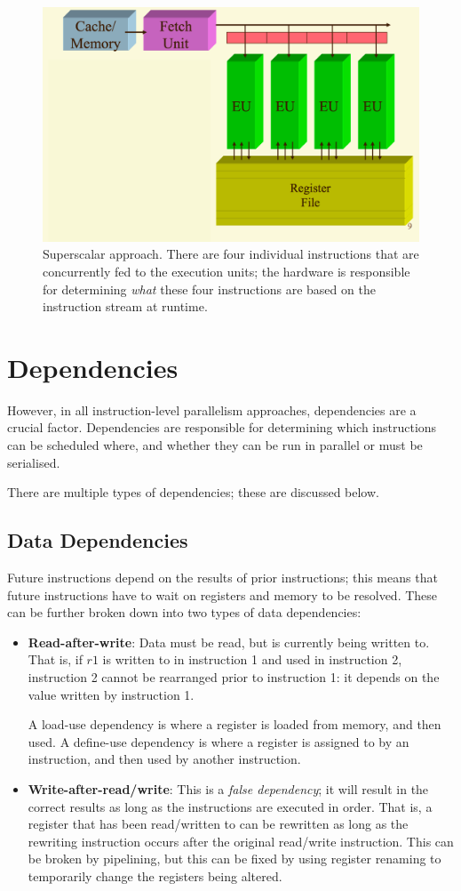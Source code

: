 \begin{figure}
\centering
\includegraphics[width=0.7\linewidth]{figures/screenshot068}
\caption[Superscalar approach.]{Superscalar approach. There are four individual instructions that are concurrently fed to the execution units; the hardware is responsible for determining \textit{what} these four instructions are based on the instruction stream at runtime.}
\label{fig:screenshot068}
\end{figure}

\section{Dependencies}
\label{sec:dependencies}
However, in all instruction-level parallelism approaches, dependencies are a crucial factor. Dependencies are responsible for determining which instructions can be scheduled where, and whether they can be run in parallel or must be serialised.

There are multiple types of dependencies; these are discussed below.

\subsection{Data Dependencies}
Future instructions depend on the results of prior instructions; this means that future instructions have to wait on registers and memory to be resolved. These can be further broken down into two types of data dependencies: \begin{itemize}
\item \textbf{Read-after-write}: Data must be read, but is currently being written to. That is, if $r1$ is written to in instruction 1 and used in instruction 2, instruction 2 cannot be rearranged prior to instruction 1: it depends on the value written by instruction 1.

A load-use dependency is where a register is loaded from memory, and then used. A define-use dependency is where a register is assigned to by an instruction, and then used by another instruction.

\item \textbf{Write-after-read/write}: This is a \textit{false dependency}; it will result in the correct results as long as the instructions are executed in order. That is, a register that has been read/written to can be rewritten as long as the rewriting instruction occurs after the original read/write instruction. This can be broken by pipelining, but this can be fixed by using register renaming to temporarily change the registers being altered.
\end{itemize}

